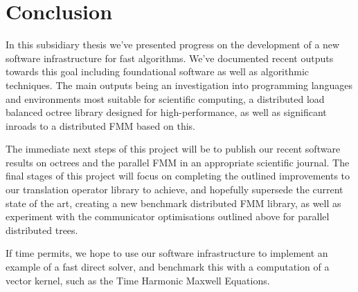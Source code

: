 \chapter{Conclusion}\label{chpt:conclusion}

In this subsidiary thesis we've presented progress on the development of a new software infrastructure for fast algorithms. We've documented recent outputs towards this goal including foundational software as well as algorithmic techniques. The main outputs being an investigation into programming languages and environments most suitable for scientific computing, a distributed load balanced octree library designed for high-performance, as well as significant inroads to a distributed FMM based on this.

The immediate next steps of this project will be to publish our recent software results on octrees and the parallel FMM in an appropriate scientific journal. The final stages of this project will focus on completing the outlined improvements to our translation operator library to achieve, and hopefully supersede the current state of the art, creating a new benchmark distributed FMM library, as well as experiment with the communicator optimisations outlined above for parallel distributed trees.

If time permits, we hope to use our software infrastructure to implement an example of a fast direct solver, and benchmark this with a computation of a vector kernel, such as the Time Harmonic Maxwell Equations.
